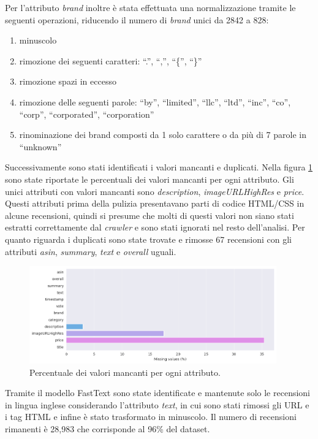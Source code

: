 Per l'attributo \textit{brand} inoltre è stata effettuata una normalizzazione tramite le seguenti operazioni, riducendo il numero di \textit{brand} unici da 2842 a 828:
\begin{enumerate}
  \item minuscolo
  \item rimozione dei seguenti caratteri: ``.'', ``,'', ``\{'', ``\}''
  \item rimozione spazi in eccesso
  \item rimozione delle seguenti parole: ``by'', ``limited'', ``llc'', ``ltd'', ``inc'', ``co'', ``corp'', ``corporated'', ``corporation''
  \item rinominazione dei brand composti da 1 solo carattere o da più di 7 parole in ``unknown''
\end{enumerate}

Successivamente sono stati identificati i valori mancanti e duplicati.
%
Nella figura \ref{fig:missing_values} sono state riportate le percentuali dei valori mancanti per ogni attributo.
Gli unici attributi con valori mancanti sono \textit{description}, \textit{imageURLHighRes} e \textit{price}. Questi attributi
prima della pulizia presentavano parti di codice HTML/CSS in alcune recensioni, quindi si presume che molti di questi valori non siano
stati estratti correttamente dal \textit{crawler} e sono stati ignorati nel resto dell'analisi.
%
Per quanto riguarda i duplicati sono state trovate e rimosse 67 recensioni con gli attributi \textit{asin}, \textit{summary}, \textit{text} e \textit{overall} uguali.

\begin{figure}[ht]
  \centering
  \includegraphics[width=0.95\textwidth]{images/dataset/missing_values.png}
  \caption{Percentuale dei valori mancanti per ogni attributo.}
  \label{fig:missing_values}
\end{figure}

Tramite il modello FastText \cite{joulin2016bag} sono state identificate e mantenute solo le recensioni in lingua inglese considerando l'attributo \textit{text}, in cui sono stati rimossi gli URL e i tag HTML e infine è stato trasformato in minuscolo.
%
Il numero di recensioni rimanenti è 28,983 che corrisponde al 96\% del dataset.

